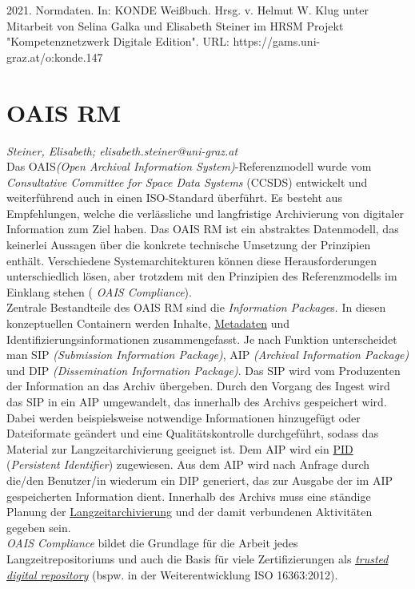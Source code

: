 \documentclass{article}
\begin{document}
2021. Normdaten. In: KONDE Weißbuch. Hrsg. v. Helmut W. Klug unter Mitarbeit von Selina Galka und Elisabeth Steiner im HRSM Projekt "Kompetenznetzwerk Digitale Edition". URL: https://gams.uni-graz.at/o:konde.147\newpage\section*{OAIS RM} \emph{Steiner, Elisabeth; elisabeth.steiner@uni-graz.at }\\
        
    Das OAIS\emph{(Open Archival Information System)}-Referenzmodell wurde vom \emph{Consultative Committee for Space Data Systems }(CCSDS) entwickelt und weiterführend auch in einen ISO-Standard überführt. Es besteht aus Empfehlungen, welche die verlässliche und langfristige Archivierung von digitaler Information zum Ziel haben. Das OAIS RM ist ein abstraktes Datenmodell, das keinerlei Aussagen über die konkrete technische Umsetzung der Prinzipien enthält. Verschiedene Systemarchitekturen können diese Herausforderungen unterschiedlich lösen, aber trotzdem mit den Prinzipien des Referenzmodells im Einklang stehen ( \emph{OAIS Compliance}). \\
            
        Zentrale Bestandteile des OAIS RM sind die \emph{Information Package}s. In diesen konzeptuellen Containern werden Inhalte, \href{http://gams.uni-graz.at/o:konde.35}{Metadaten} und Identifizierungsinformationen zusammengefasst. Je nach Funktion unterscheidet man SIP\emph{ (Submission Information Package)}, AIP \emph{(Archival Information Package)} und DIP\emph{ (Dissemination Information Package)}. Das SIP wird vom Produzenten der Information an das Archiv übergeben. Durch den Vorgang des Ingest wird das SIP in ein AIP umgewandelt, das innerhalb des Archivs gespeichert wird. Dabei werden beispielsweise notwendige Informationen hinzugefügt oder Dateiformate geändert und eine Qualitätskontrolle durchgeführt, sodass das Material zur Langzeitarchivierung geeignet ist. Dem AIP wird ein \href{http://gams.uni-graz.at/o:konde.12}{PID} (\emph{Persistent Identifier}) zugewiesen. Aus dem AIP wird nach Anfrage durch die/den Benutzer/in wiederum ein DIP generiert, das zur Ausgabe der im AIP gespeicherten Information dient. Innerhalb des Archivs muss eine ständige Planung der \href{http://gams.uni-graz.at/o:konde.6}{Langzeitarchivierung} und der damit verbundenen Aktivitäten gegeben sein. \\
            
        \emph{OAIS Compliance} bildet die Grundlage für die Arbeit jedes Langzeitrepositoriums und auch die Basis für viele Zertifizierungen als \emph{\href{http://gams.uni-graz.at/o:konde.13}{trusted digital repository}} (bspw. in der Weiterentwicklung ISO 16363:2012).\\
            
\end{document}
